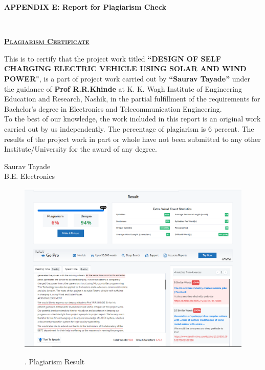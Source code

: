 \documentclass[a4paper,12pt]{article}
\begin{document}
\newpage
\begin{center}
\LARGE\textbf{APPENDIX E: Report for Plagiarism Check}
\\[1cm]
\end{center}
\thispagestyle{empty}
\begin{center}
\textbf{\LARGE\scshape\underline{Plagiarism Certificate}}\\[2cm]
\end{center}
\large This is to certify that the project work titled \textbf{“DESIGN OF SELF CHARGING ELECTRIC VEHICLE USING SOLAR AND WIND POWER"}, is a part of project work carried out by \textbf{“Saurav Tayade”}
under the guidance of\textbf{ Prof R.R.Khinde} at K. K. Wagh Institute of
Engineering Education and Research, Nashik, in the partial fulfillment of the requirements
for Bachelor’s degree in Electronics and Telecommunication Engineering.\\
\large To the best of our knowledge, the work included in this report is an original work
carried out by us independently. The percentage of plagiarism is 6 percent. The results of the
project work in part or whole have not been submitted to any other Institute/University for
the award of any degree.

\vspace{4cm}
\begin{flushright}
Saurav Tayade\\

B.E. Electronics\\
\end{flushright}

\newpage
\begin{figure}[!h]
\centering
\includegraphics[scale=0.5]{pl.png}\\
\caption{. Plagiarism Result}
\end{figure}
\end{document}
